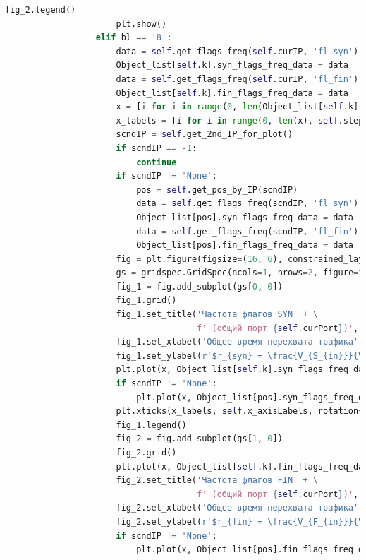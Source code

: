 \documentclass[bachelor, och, coursework]{SCWorks}
\begin{document}
\begin{lstlisting}[language=Python]
                      fig_2.legend()
                      plt.show()
                  elif bl == '8':
                      data = self.get_flags_freq(self.curIP, 'fl_syn')
                      Object_list[self.k].syn_flags_freq_data = data
                      data = self.get_flags_freq(self.curIP, 'fl_fin')
                      Object_list[self.k].fin_flags_freq_data = data
                      x = [i for i in range(0, len(Object_list[self.k].syn_flags_freq_data))]
                      x_labels = [i for i in range(0, len(x), self.step)]
                      scndIP = self.get_2nd_IP_for_plot()
                      if scndIP == -1:
                          continue
                      if scndIP != 'None':
                          pos = self.get_pos_by_IP(scndIP)
                          data = self.get_flags_freq(scndIP, 'fl_syn')
                          Object_list[pos].syn_flags_freq_data = data
                          data = self.get_flags_freq(scndIP, 'fl_fin')
                          Object_list[pos].fin_flags_freq_data = data
                      fig = plt.figure(figsize=(16, 6), constrained_layout=True)
                      gs = gridspec.GridSpec(ncols=1, nrows=2, figure=fig)
                      fig_1 = fig.add_subplot(gs[0, 0])
                      fig_1.grid()
                      fig_1.set_title('Частота флагов SYN' + \
                                      f' (общий порт {self.curPort})', fontsize=15 )
                      fig_1.set_xlabel('Общее время перехвата трафика', fontsize=15)
                      fig_1.set_ylabel(r'$r_{syn} = \frac{V_{S_{in}}}{V_{tcp}}$', fontsize=15)
                      plt.plot(x, Object_list[self.k].syn_flags_freq_data, 'b', label=self.curIP)
                      if scndIP != 'None':
                          plt.plot(x, Object_list[pos].syn_flags_freq_data, 'r', label=scndIP)
                      plt.xticks(x_labels, self.x_axisLabels, rotation=30, fontsize=8)
                      fig_1.legend()
                      fig_2 = fig.add_subplot(gs[1, 0])
                      fig_2.grid()
                      plt.plot(x, Object_list[self.k].fin_flags_freq_data, 'orange', label=self.curIP)
                      fig_2.set_title('Частота флагов FIN' + \
                                      f' (общий порт {self.curPort})', fontsize=15 )
                      fig_2.set_xlabel('Общее время перехвата трафика', fontsize=15)
                      fig_2.set_ylabel(r'$r_{fin} = \frac{V_{F_{in}}}{V_{tcp}}$', fontsize=15)
                      if scndIP != 'None':
                          plt.plot(x, Object_list[pos].fin_flags_freq_data, 'g', label=scndIP)

\end{lstlisting}
\end{document}
